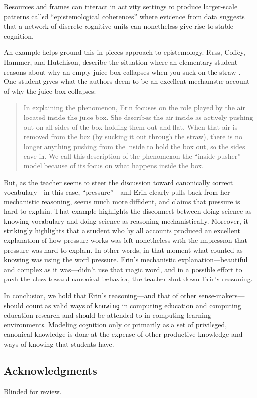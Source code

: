 Resources and frames can interact in activity settings to produce
larger-scale patterns called ``epistemological coherences'' \cite{rosenberg_multiple_2006} where evidence from data suggests that a
network of discrete cognitive units can nonetheless give rise to stable
cognition.

An example helps ground this in-pieces approach to epistemology. Russ, Coffey, Hammer, and Hutchison, describe the
situation where an elementary student reasons about why an empty juice
box collapses when you suck on the straw \cite{russ_making_2008}. One student gives what the
authors deem to be an excellent mechanistic account of why the juice box
collapses:

\begin{quote}
  In explaining the phenomenon, Erin focuses on the role played by the air located inside the juice box. She describes the air inside as actively pushing out on all sides of the box holding them out and flat. When that air is removed from the box (by sucking it out through the straw), there is no longer anything pushing from the inside to hold the box out, so the sides cave in. We call this description of the phenomenon the “inside-pusher” model because of its focus on what happens inside the box. \cite{russ_making_2008}
\end{quote}

But, as the teacher seems to steer the discussion toward canonically correct
vocabulary---in this case, ``pressure''---and Erin clearly pulls back
from her mechanistic reasoning, seems much more diffident, and claims
that pressure is hard to explain. That example highlights the disconnect
between doing science as knowing vocabulary and doing science as
reasoning mechanistically. Moreover, it strikingly highlights that a
student who by all accounts produced an excellent explanation of how
pressure works was left nonetheless with the impression that pressure
was hard to explain. In other words, in that moment what counted as knowing was using the word pressure. Erin's mechanistic explanation---beautiful and complex as it was---didn't use that magic word, and in a possible effort to push the class toward canonical behavior, the teacher shut down Erin's reasoning.

In conclusion, we hold that Erin's reasoning---and that of other sense-makers---should count as valid ways of \texttt{knowing} in computing education and computing education research and should be attended to in computing learning environments. Modeling cognition only or primarily as a set of privileged, canonical knowledge is done at the expense of other productive knowledge and ways of knowing that students have.

\subsection{Acknowledgments}\label{acknowledgments}

Blinded for review.

\clearpage



